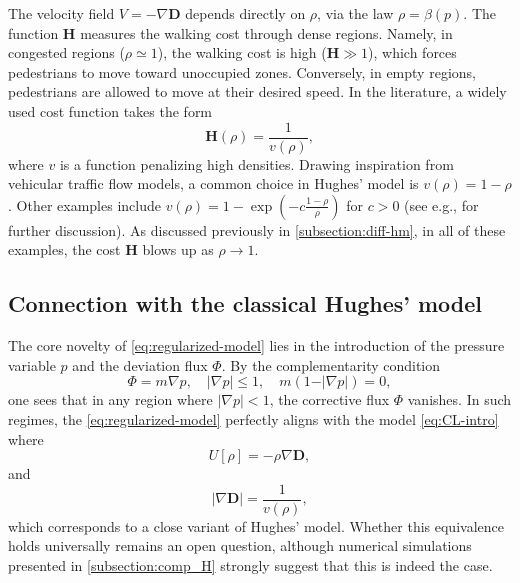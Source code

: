 \documentclass[final,reqno]{amsart}
\theoremstyle{plain}
\theoremstyle{definition}
\theoremstyle{remark}
\numberwithin{remark}{section}	%
\numberwithin{example}{section}	%
\newcommand{\de}{\mathbf{D}}
\newcommand{\he}{\mathbf{H}}
\newcommand{\eg}{e.g.,\xspace}	%
\begin{document}
The velocity field $V=-\nabla\de$ depends directly on $\rho$, via the law $\rho = \beta(p)$. The function $\he$ measures the walking cost through dense regions. Namely, in congested regions ($\rho\simeq 1$), the walking cost is high ($\he \gg 1$), which forces pedestrians to move toward unoccupied zones. Conversely, in empty regions, pedestrians are allowed to move at their desired speed. In the literature, a widely used cost function takes the form 
\[
\he(\rho) = \frac{1}{v(\rho)},
\]  
where $v$ is a function penalizing high densities. Drawing inspiration from vehicular traffic flow models, a common choice in Hughes' model is $v(\rho) = 1-\rho$. Other examples include $v(\rho) = 1- \exp(-c\frac{1-\rho}{\rho})$ for $c>0$ (see \eg \cite{Silvasim} for further discussion). As discussed previously in \cref{subsection:diff-hm}, in all of these examples, the cost $\he$ blows up as $\rho\to 1$. 

\subsection{Connection with the classical Hughes' model}\label{subsection:connection-cl-HM}
  The core novelty of \eqref{eq:regularized-model} lies in the introduction of the pressure variable $p$ and the deviation flux $\Phi$.  By the complementarity condition 
\[
\Phi=m \nabla p, \quad \vert \nabla p\vert \leq 1, \quad m(1-\vert \nabla p\vert)=0,
\]
one sees that in any region where $\vert\nabla p\vert < 1$, the corrective flux $\Phi$ vanishes. In such regimes,  the \eqref{eq:regularized-model} perfectly aligns with the model \eqref{eq:CL-intro} where 
 \begin{equation}\label{VH1}
  U[\rho]= -\rho\nabla \de,    
 \end{equation}  
and  \begin{equation}\label{VH2}\vert \nabla \de \vert =\frac{1}{v(\rho)},  \end{equation}  
which corresponds to a close variant of Hughes' model.  Whether this equivalence holds universally remains an open question, although numerical simulations presented in \cref{subsection:comp_H} strongly suggest that this is indeed the case.  
\end{document}
